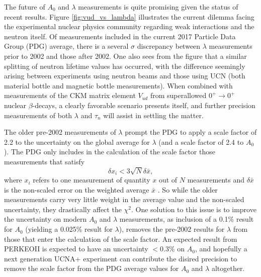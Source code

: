 The future of $A_0$ and $\lambda$ measurements is quite promising given the status of recent results. Figure
\ref{fig:vud_vs_lambda} illustrates the current dilemma facing the experimental nuclear physics community regarding
weak interactions and the neutron itself.
Of measurements included in the current 2017 Particle Data Group (PDG) average, 
there is a several $\sigma$ discrepancy between $\lambda$ measurements prior to 2002 and those
after 2002. One also sees from the figure that a similar splitting of neutron lifetime values has occurred,
with the difference seemingly arising between experiments using neutron beams \cite{yue2013,byrne1996}
and those using UCN (both
material bottle \cite{serebrov2005,arzumanov2015,steyerl2012,pichlmaier2010,mampe1993}
and magnetic bottle \cite{pattie2017} measurements). When combined with measurements of the CKM
matrix element $V_{ud}$ from superallowed $0^+\rightarrow 0^+$ nuclear $\beta$-decays, a clearly favorable
scenario presents itself, and further precision measurements of both $\lambda$ and $\tau_n$ will assist
in settling the matter.

The older pre-2002 measurements of $\lambda$ prompt the PDG to apply a scale factor of 2.2 to the uncertainty
on the global average for $\lambda$ (and a scale factor of 2.4 to $A_0$).
The PDG only includes in
the calculation of the scale factor those measurements that satisfy
\begin{equation}
  \delta x_i < 3 \sqrt{N} \delta \bar{x},
\end{equation}
\noindent where $x_i$ refers to one measurement of quantity $x$ out of $N$ measurements and
$\delta \bar{x}$ is the non-scaled error on the weighted average $\bar{x}$ \cite{pdg}. So while
the older measurements carry very little weight in the average value and the non-scaled uncertainty,
they drastically affect the $\chi^2$. One solution to this issue is to improve the uncertainty on
modern $A_0$ and $\lambda$ measurements, as inclusion of a 0.1\% result for $A_0$ (yielding a 0.025\% result for
$\lambda$), removes the pre-2002 results for $\lambda$
from those that enter the calculation of the
scale factor. An expected result from PERKEOII is expected to have an
uncertainty $<0.3\%$ on $A_0$, and hopefully a next generation
UCNA$+$ experiment can contribute the disired precision to remove the scale factor from the PDG average values
for $A_0$ and $\lambda$ altogether.















